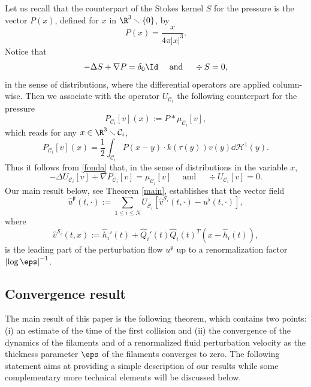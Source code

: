 Let us recall that the counterpart of the Stokes kernel $S$ for the
pressure is the vector $P(x) $, defined for $x$ in $\R^3 \smallsetminus \{ 0 \}$, by
\begin{equation} \label{noyauP}
P(x) = \frac x {4 \pi |x|^3}.
\end{equation}
Notice that
\begin{equation}
\label{fonda}
-\Delta S + \nabla P = \delta_{0} \Id \quad \text{ and } \quad \div S = 0,
\end{equation}
in the sense of distributions, where the differential operators are applied column-wise.
Then we associate with the operator $U_{\mathcal C_i}$ the following counterpart for the pressure
\begin{equation} \label{def:P}
P_{\mathcal C_i}[v](x) := P \ast \mu_{\mathcal C_i} [v],
\end{equation}
which reads {for any $x\in\R^3\smallsetminus\mathcal C_i$},
\begin{equation*}
P_{\mathcal C_i}[v](x) = {\frac 1 2}\int_{\mathcal{C}_i} P(x -y) \cdot k(\tau(y)) v(y) \dd \mathcal{H}^1 (y).
\end{equation*}
Thus it follows from
\eqref{fonda} that, in the sense of distributions {in}
the variable $x$,
\begin{equation}
\label{singm}
-\Delta U_{\mathcal C_i}[v] + \nabla P_{\mathcal C_i}[v] = \mu_{\mathcal C_i} [v]\quad \text{ and } \quad \div U_{\mathcal C_i}[v] = 0.
\end{equation}
Our main result below, see Theorem \ref{main}, establishes that the vector field
\begin{equation}
\label{hatup}
{\hat u}^\mathfrak{p}(t,\cdot) := \sum_{1 \leq i \leq N} U_{\hat{\mathcal C}_i}[{\hat v}^{{\mathcal S}_i}(t,\cdot) - u^\flat (t,\cdot)],
\end{equation}
where
\begin{equation}
\label{hatS}
{\hat v}^{{\mathcal S}_i} (t,x) := {\hat h}_i' (t) + {\hat Q}_i' (t) {\hat Q}_i (t)^T (x- {\hat h}_i(t)),
\end{equation}
is the leading part of the perturbation flow ${u}^\mathfrak{p}$ up to a renormalization factor $\left|\log \eps\right|^{-1}$.

\subsection{Convergence result}
\label{sec-cv}

The main result of this paper is the following theorem{, which contains two points: (i) an estimate of} the time of the first collision and {(ii) the convergence of} the dynamics of the filaments and {of a renormalized fluid} perturbation velocity as the thickness parameter $\eps$ of the filaments converges to zero. The following statement aims at {providing} a {simple} description of our results while some complementary more technical elements will be discussed below.

